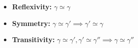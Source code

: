\documentclass[preview]{standalone}
\begin{document}
\begin{center}
\begin{itemize} \item \textbf{Reflexivity:} $\gamma \simeq \gamma$ \item \textbf{Symmetry:} $\gamma\simeq \gamma' \implies \gamma'\simeq\gamma$ \item \textbf{Transitivity:} $\gamma\simeq \gamma', \gamma'\simeq\gamma''\implies\gamma\simeq\gamma''$\end{itemize}
\end{center}
\end{document}
